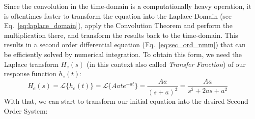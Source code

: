Since the convolution in the time-domain is a computationally heavy operation,
it is oftentimes faster to transform the equation into the Laplace-Domain (see Eq.~\ref{eq:laplace_domain}),
apply the Convolution Theorem and perform the multiplication there,
and transform the results back to the time-domain.
This results in a second order differential equation (Eq.~\ref{eq:sec_ord_nmm}) that
can be efficiently solved by numerical integration.
To obtain this form, we need the Laplace transform $H_e(s)$ (in this context also called \textit{Transfer Function})
of our response function $h_e(t)$:
\[H_e(s) =\mathscr{L}\{h_e(t)\}  = \mathscr{L}\{Aate^{-at} \} = \frac{Aa}{(s+a)^2} = \frac{Aa}{s^2+2as+a^2}\label{eq:laplace_h_e}\]
%
%
%
With that, we can start to transform our initial equation into the desired Second Order System:

